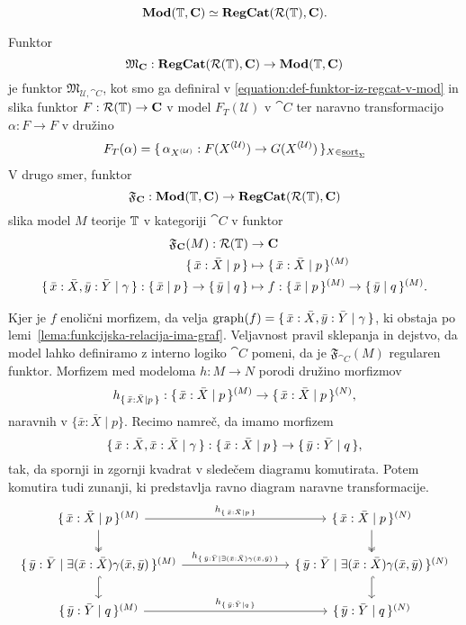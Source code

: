 \documentclass[../kategoricna_logika.tex]{subfiles}
\begin{document}
$$\mathbf{Mod}(\mathbb{T}, {\operatorname{\mathbf{C}}}) \simeq {\operatorname{\mathbf{RegCat}}}(\mathcal{R}(\mathbb{T}), {\operatorname{\mathbf{C}}}).$$
\begin{definicija}\label{def:ekvivalenca-reg-logike-reg-kategorij}
  Funktor
$$\mathfrak{M}_{{\operatorname{\mathbf{C}}}} : {\operatorname{\mathbf{RegCat}}}(\mathcal{R}(\mathbb{T}), {\operatorname{\mathbf{C}}}) \to \mathbf{Mod}(\mathbb{T}, {\operatorname{\mathbf{C}}})$$
je funktor $\mathfrak{M}_{\mathcal{U}, \cat{C}}$, kot smo ga definiral
v \eqref{equation:def-funktor-iz-regcat-v-mod} in slika funktor
$F : \mathcal{R}(\mathbb{T}) \to {\operatorname{\mathbf{C}}}$ v model $F_T(\mathcal{U})$ v
$\cat{C}$ ter naravno transformacijo $\alpha : F \to F$ v družino
$$F_T(\alpha) = \lbrace\,\alpha_{{X}^{(\mathcal{U})}} : F({X}^{(\mathcal{U})}) \to G({X}^{(\mathcal{U})})\,\rbrace_{X \in \underline{\mathrm{sort}}_{\Sigma}}$$
V drugo smer, funktor
$$\mathfrak{F}_{{\operatorname{\mathbf{C}}}} : \mathbf{Mod}(\mathbb{T}, {\operatorname{\mathbf{C}}}) \to {\operatorname{\mathbf{RegCat}}}(\mathcal{R}(\mathbb{T}), {\operatorname{\mathbf{C}}})$$
slika model $M$ teorije $\mathbb{T}$ v kategoriji $\cat{C}$ v funktor
\begin{align*}
  \mathfrak{F}_{{\operatorname{\mathbf{C}}}}(M) : \mathcal{R}(\mathbb{T}) &\to {\operatorname{\mathbf{C}}}\\
  \lbrace\,\bar{x}:\bar{X} \mid  p\,\rbrace &\mapsto \lbrace\,\bar{x}:\bar{X} \mid  p\,\rbrace^{(M)} \\
  \lbrace\,\bar{x}:\bar{X},\bar{y}:\bar{Y} \mid \gamma\,\rbrace : \lbrace\,\bar{x} \mid  p\,\rbrace \to \lbrace\,\bar{y} \mid  q\,\rbrace
                                              &\mapsto f : \lbrace\,\bar{x} \mid  p\,\rbrace^{(M)} \to \lbrace\,\bar{y} \mid  q\,\rbrace^{(M)}.
\end{align*}
\end{definicija}
Kjer je $f$ enolični morfizem, da velja $\mathrm{graph}(f) = \lbrace\,\bar{x}:\bar{X},\bar{y}:\bar{Y} \mid \gamma\,\rbrace$, ki
obstaja po lemi~\ref{lema:funkcijska-relacija-ima-graf}.
Veljavnost pravil sklepanja in dejstvo, da model lahko definiramo z
interno logiko $\cat{C}$ pomeni, da je $\mathfrak{F}_{\cat{C}}(M)$
regularen funktor.  Morfizem med modeloma $h : M \to N$ porodi družino
morfizmov
$$h_{\lbrace\,\bar{x}:\bar{X} \mid  p\,\rbrace} : \lbrace\,\bar{x}:\bar{X} \mid  p\,\rbrace^{(M)} \to \lbrace\,\bar{x}:\bar{X} \mid  p\,\rbrace^{(N)},$$
naravnih v $\{\bar{x}:\bar{X} \mid p\}$. Recimo namreč, da imamo morfizem
$$\lbrace\,\bar{x}:\bar{X},\bar{x}:\bar{X} \mid \gamma\,\rbrace : \lbrace\,\bar{x}:\bar{X} \mid  p\,\rbrace \to \lbrace\,\bar{y}:\bar{Y} \mid  q\,\rbrace,$$
tak, da spornji in zgornji kvadrat v sledečem diagramu komutirata.
Potem komutira tudi zunanji, ki predstavlja ravno diagram naravne transformacije.
\begin{equation*}
  \begin{tikzcd}[column sep=3cm]
    {\set{\bar{x}:\bar{X} \mid  p}^{(M)}} \ar[d, two heads] \ar[r, "{h_{\set{\bar{x}:\bar{X} \mid  p}}}"] &
    {\set{\bar{x}:\bar{X} \mid  p}^{(N)}} \ar[d, two heads] \\
    \set{\bar{y}:\bar{Y} \mid  \exists (\bar{x}:\bar{X}) \gamma(\bar{x}, \bar{y})}^{(M)}
    \ar[d, hook] \ar[r, "{h_{\set{\bar{y}:\bar{Y} \mid  \exists (\bar{x}:\bar{X}) \gamma(\bar{x}, \bar{y})}}}"] &
    \set{\bar{y}:\bar{Y} \mid  \exists (\bar{x}:\bar{X}) \gamma(\bar{x}, \bar{y})}^{(N)} \ar[d, hook] \\
    \set{\bar{y}:\bar{Y} \mid  q}^{(M)} \ar[r,
    "{h_{\set{\bar{y}:\bar{Y} \mid  q}}}"] & \set{\bar{y}:\bar{Y} \mid  q}^{(N)}
  \end{tikzcd}
\end{equation*}
\end{document}
